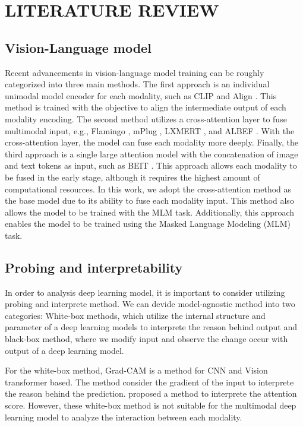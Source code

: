 \chapter{LITERATURE REVIEW}

\section{Vision-Language model}
Recent advancements in vision-language model training can be roughly categorized into three main methods. 
The first approach is an individual unimodal model encoder for each modality, such as CLIP \cite{clip} and Align \cite{align}.
This method is trained with the objective to align the intermediate output of each modality encoding. 
The second method utilizes a cross-attention layer to fuse multimodal input, e.g., Flamingo \cite{flamingo}, mPlug \cite{mplug}, LXMERT \cite{lxmert}, and ALBEF \cite{albef}. 
With the cross-attention layer, the model can fuse each modality more deeply. 
Finally, the third approach is a single large attention model with the concatenation of image and text tokens as input, such as BEIT \cite{beit-3}. 
This approach allows each modality to be fused in the early stage, although it requires the highest amount of computational resources.
In this work, we adopt the cross-attention method as the base model due to its ability to fuse each modality input. This method also allows the model to be trained with the MLM task. 
Additionally, this approach enables the model to be trained using the Masked Language Modeling (MLM) task.


\section{Probing and interpretability}
In order to analysis deep learning model, it is important to consider utilizing probing and interprete method.
We can devide model-agnostic method into two categories: White-box methods, which utilize the internal structure and parameter of a deep learning models to interprete the reason behind output and
black-box method, where we modify input and observe the change occur with output of a deep learning model.

For the white-box method, Grad-CAM  is a method for CNN and Vision transformer based.
The method consider the gradient of the input to interprete the reason behind the prediction.
 proposed a method to interprete the attention score.
However, these white-box method is not suitable for the multimodal deep learning model to analyze the interaction between each modality.


